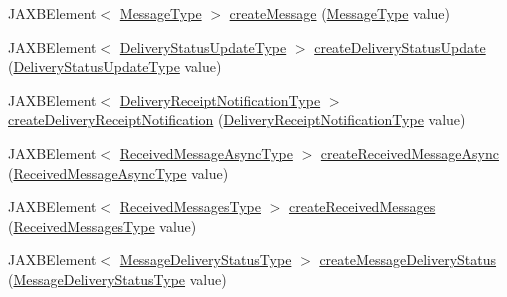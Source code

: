 \begin{DoxyCompactItemize}
\item 
JAXBElement$<$ \hyperlink{classcom_1_1telefonica_1_1schemas_1_1unica_1_1rest_1_1mms_1_1v1_1_1MessageType}{MessageType} $>$ \hyperlink{classcom_1_1telefonica_1_1schemas_1_1unica_1_1rest_1_1mms_1_1v1_1_1ObjectFactory_aeb4e31484df0338fafcf919f8b26f9ca}{createMessage} (\hyperlink{classcom_1_1telefonica_1_1schemas_1_1unica_1_1rest_1_1mms_1_1v1_1_1MessageType}{MessageType} value)
\item 
JAXBElement$<$ \hyperlink{classcom_1_1telefonica_1_1schemas_1_1unica_1_1rest_1_1mms_1_1v1_1_1DeliveryStatusUpdateType}{DeliveryStatusUpdateType} $>$ \hyperlink{classcom_1_1telefonica_1_1schemas_1_1unica_1_1rest_1_1mms_1_1v1_1_1ObjectFactory_a5732d6316865f88b7c3f3c2357006661}{createDeliveryStatusUpdate} (\hyperlink{classcom_1_1telefonica_1_1schemas_1_1unica_1_1rest_1_1mms_1_1v1_1_1DeliveryStatusUpdateType}{DeliveryStatusUpdateType} value)
\item 
JAXBElement$<$ \hyperlink{classcom_1_1telefonica_1_1schemas_1_1unica_1_1rest_1_1mms_1_1v1_1_1DeliveryReceiptNotificationType}{DeliveryReceiptNotificationType} $>$ \hyperlink{classcom_1_1telefonica_1_1schemas_1_1unica_1_1rest_1_1mms_1_1v1_1_1ObjectFactory_ac21c3c5cfa9015c9ef7f300bc3991f83}{createDeliveryReceiptNotification} (\hyperlink{classcom_1_1telefonica_1_1schemas_1_1unica_1_1rest_1_1mms_1_1v1_1_1DeliveryReceiptNotificationType}{DeliveryReceiptNotificationType} value)
\item 
JAXBElement$<$ \hyperlink{classcom_1_1telefonica_1_1schemas_1_1unica_1_1rest_1_1mms_1_1v1_1_1ReceivedMessageAsyncType}{ReceivedMessageAsyncType} $>$ \hyperlink{classcom_1_1telefonica_1_1schemas_1_1unica_1_1rest_1_1mms_1_1v1_1_1ObjectFactory_ad7cfbca7e4550d710498a644fc0246d5}{createReceivedMessageAsync} (\hyperlink{classcom_1_1telefonica_1_1schemas_1_1unica_1_1rest_1_1mms_1_1v1_1_1ReceivedMessageAsyncType}{ReceivedMessageAsyncType} value)
\item 
JAXBElement$<$ \hyperlink{classcom_1_1telefonica_1_1schemas_1_1unica_1_1rest_1_1mms_1_1v1_1_1ReceivedMessagesType}{ReceivedMessagesType} $>$ \hyperlink{classcom_1_1telefonica_1_1schemas_1_1unica_1_1rest_1_1mms_1_1v1_1_1ObjectFactory_aefc53b51e31afa0b69dc0085851f7e6c}{createReceivedMessages} (\hyperlink{classcom_1_1telefonica_1_1schemas_1_1unica_1_1rest_1_1mms_1_1v1_1_1ReceivedMessagesType}{ReceivedMessagesType} value)
\item 
JAXBElement$<$ \hyperlink{classcom_1_1telefonica_1_1schemas_1_1unica_1_1rest_1_1mms_1_1v1_1_1MessageDeliveryStatusType}{MessageDeliveryStatusType} $>$ \hyperlink{classcom_1_1telefonica_1_1schemas_1_1unica_1_1rest_1_1mms_1_1v1_1_1ObjectFactory_aef3df591e9ae98fcc84427a493ccddfe}{createMessageDeliveryStatus} (\hyperlink{classcom_1_1telefonica_1_1schemas_1_1unica_1_1rest_1_1mms_1_1v1_1_1MessageDeliveryStatusType}{MessageDeliveryStatusType} value)
\end{DoxyCompactItemize}


